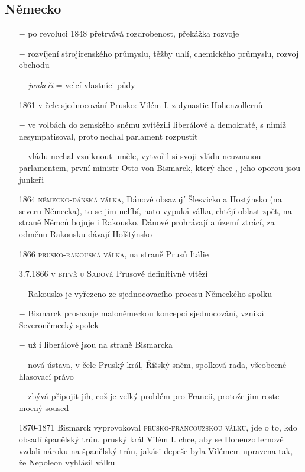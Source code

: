 \documentclass{article}
\begin{document}
\subsection*{Německo}
\begin{itemize}
    \vspace{-0.5em}
    \setlength\itemsep{0.15em}
    \item[$-$] po revoluci 1848 přetrvává rozdrobenost, překážka rozvoje
    \item[$-$] rozvíjení strojírenského průmyslu, těžby uhlí, chemického průmyslu, rozvoj obchodu
    \item[$-$] \textit{junkeři} = velcí vlastníci půdy
    \item[1861] v čele sjednocování Prusko: Vilém I. z dynastie Hohenzollernů
    \item[$-$] ve volbách do zemského sněmu zvítězili liberálové a demokraté, s nimiž nesympatisoval, proto nechal parlament rozpustit
    \item[$-$] vládu nechal vzniknout uměle, vytvořil si svoji vládu neuznanou parlamentem, první ministr Otto von Bismarck, který chce , jeho oporou jsou junkeři
    \item[1864] \textsc{německo-dánská válka}, Dánové obsazují  Šlesvicko a Hostýnsko (na severu Německa), to se jim nelíbí, nato vypuká válka, chtějí oblast zpět, na straně Němců bojuje i Rakousko, Dánové prohrávají a území ztrácí, za odměnu Rakousku dávají Holštýnsko
    \item[1866] \textsc{prusko-rakouská válka}, na straně Prusů Itálie
    \item[3.7.1866] v \textsc{bitvě u Sadové} Prusové definitivně vítězí
    \item[$-$] Rakousko je vyřezeno ze sjednocovacího procesu Německého spolku
    \item[$-$] Bismarck prosazuje maloněmeckou koncepci sjednocování, vzniká Severoněmecký spolek
    \item[$-$] už i liberálové jsou na straně Bismarcka
    \item[$-$] nová ústava, v čele Pruský král, Říšský sněm, spolková rada, všeobecné hlasovací právo
    \item[$-$] zbývá připojit jih, což je velký problém pro Francii, protože jim roste mocný soused
    \item[1870-1871] Bismarck vyprovokoval \textsc{prusko-francouzskou válku}, jde o to, kdo obsadí španělský trůn, pruský král Vilém I. chce, aby se Hohenzollernové vzdali nároku na španělský trůn, jakási depeše byla Vilémem upravena tak, že Nepoleon vyhlásil válku

\end{itemize}
\end{document}

